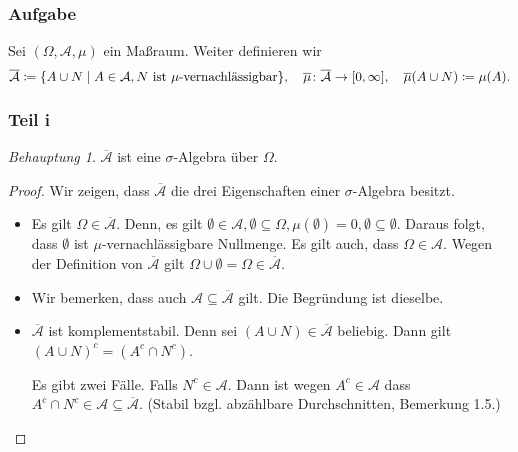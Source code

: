 \documentclass[draft,a5paper]{article}
\theoremstyle{remark}
\newtheorem*{Behauptung}{Behauptung}
\providecommand{\olA}{\overline{\mathcal{A}}}
\providecommand{\olm}{\overline{\mu}}
\begin{document}
\subsubsection{Aufgabe}
Sei \((\Omega, \mathcal{A}, \mu)\) ein Maßraum.  Weiter definieren wir
\[\olA \coloneq \{A \cup N \mid A \in \mathcal{A}, N \text{ ist
  }\mu\text{-vernachlässigbar}\}, \quad \olm\colon \olA \to
  \interval{0}{\infty}, \quad \olm(A \cup N) \coloneq \mu(A).\]
\subsubsection{Teil i}
\begin{Behauptung}
  \(\olA\) ist eine \(\sigma\)-Algebra über \(\Omega\).
\end{Behauptung}
\begin{proof}
  Wir zeigen, dass \(\olA\) die drei Eigenschaften einer
  \(\sigma\)-Algebra besitzt.
  \begin{itemize}
  \item Es gilt \(\Omega \in \olA\).  Denn, es gilt
    \(\emptyset \in \mathcal{A}, \emptyset \subseteq \Omega, \mu(\emptyset) = 0, \emptyset \subseteq \emptyset\).  Daraus folgt, dass
    \(\emptyset\) ist \(\mu\)-vernachlässigbare Nullmenge.  Es gilt auch, dass
    \(\Omega \in \mathcal{A}\).  Wegen der Definition von \(\olA\) gilt
    \(\Omega \cup \emptyset = \Omega \in \olA\).  
  \item Wir bemerken, dass auch
    \(\mathcal{A} \subseteq \olA\) gilt.  Die Begründung ist dieselbe.
  \item \(\olA\) ist komplementstabil.  Denn sei
    \((A \cup N) \in \olA\) beliebig.  Dann gilt
    \((A \cup N)^{c} = (A^{c}\cap N^{c}) \).

    Es gibt zwei Fälle.  Falls \(N^{c} \in \mathcal{A}\).  Dann ist wegen
    \(A^{c} \in \mathcal{A}\) dass
    \(A^{c} \cap N^{c} \in \mathcal{A} \subseteq \olA\).  (Stabil bzgl. abzählbare
    Durchschnitten, Bemerkung 1.5.)


\end{itemize}
\end{proof}
\end{document}
